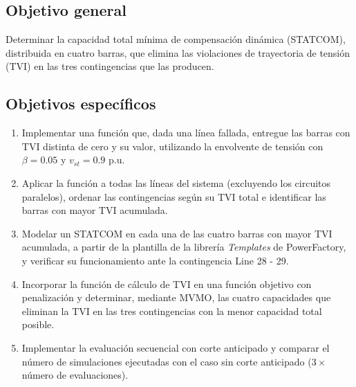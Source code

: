\subsection{Objetivo general}

Determinar la capacidad total mínima de compensación dinámica (STATCOM), distribuida en cuatro barras, que elimina las violaciones de trayectoria de tensión (TVI) en las tres contingencias que las producen.

\subsection{Objetivos específicos}

\begin{enumerate}
    \item Implementar una función que, dada una línea fallada, entregue las barras con TVI distinta de cero y su valor, utilizando la envolvente de tensión con $\beta = 0.05$ y $v_{st} = 0.9$ p.u.
    \item Aplicar la función a todas las líneas del sistema (excluyendo los circuitos paralelos), ordenar las contingencias según su TVI total e identificar las barras con mayor TVI acumulada.
    \item Modelar un STATCOM en cada una de las cuatro barras con mayor TVI acumulada, a partir de la plantilla de la librería \textit{Templates} de PowerFactory, y verificar su funcionamiento ante la contingencia Line 28 - 29.
    \item Incorporar la función de cálculo de TVI en una función objetivo con penalización y determinar, mediante MVMO, las cuatro capacidades que eliminan la TVI en las tres contingencias con la menor capacidad total posible.
    \item Implementar la evaluación secuencial con corte anticipado y comparar el número de simulaciones ejecutadas con el caso sin corte anticipado ($3 \times$ número de evaluaciones).
\end{enumerate}